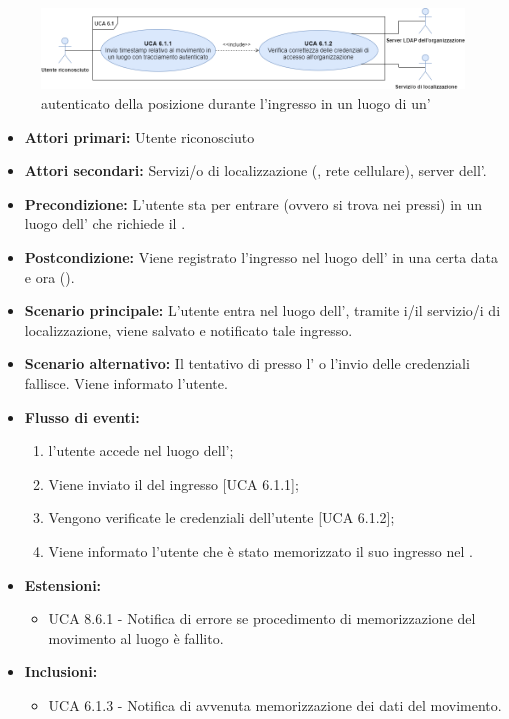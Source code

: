 \begin{figure}[h]
	\centering
	\includegraphics[scale=0.4, center]{Sezioni/UseCase/Immagini/UCA6.1.png}
	\caption{ autenticato della posizione durante l'ingresso in un luogo di un'}
\end{figure}

\begin{itemize}
	\item \textbf{Attori primari:} Utente riconosciuto
	\item \textbf{Attori secondari:} Servizi/o di localizzazione (, rete cellulare), server  dell'.
	\item \textbf{Precondizione:} L'utente sta per entrare (ovvero si trova nei pressi) in un luogo dell' che richiede il .
	\item \textbf{Postcondizione:} Viene registrato l'ingresso nel luogo dell' in una certa data e ora ().
	\item \textbf{Scenario principale:} L'utente entra nel luogo dell', tramite i/il servizio/i di localizzazione, viene salvato e notificato tale ingresso.
	\item \textbf{Scenario alternativo:} Il tentativo di  presso l' o l'invio delle credenziali fallisce. Viene informato l'utente.
	\item \textbf{Flusso di eventi:}
	\begin{enumerate}
		\item l'utente accede nel luogo dell';
		\item Viene inviato il  del ingresso [UCA 6.1.1];
		\item Vengono verificate le credenziali dell'utente [UCA 6.1.2];
		\item Viene informato l'utente che è stato memorizzato il suo ingresso nel .
	\end{enumerate}
	\item \textbf{Estensioni:}
	\begin{itemize}
		\item UCA 8.6.1 - Notifica di errore se procedimento di memorizzazione del movimento al luogo è fallito.
	\end{itemize}
	\item \textbf{Inclusioni:}
	\begin{itemize}
		\item UCA 6.1.3 - Notifica di avvenuta memorizzazione dei dati del movimento.
	\end{itemize}
\end{itemize}

